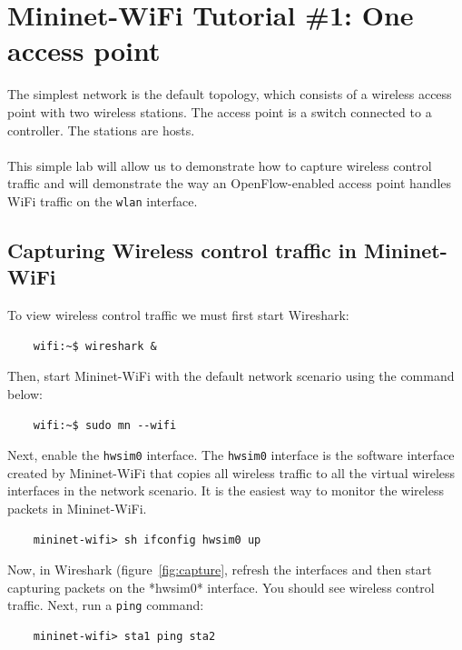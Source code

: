 \section{Mininet-WiFi Tutorial \#1: One access point}

The simplest network is the default topology, which consists of a wireless access point with two wireless stations. The access point is a switch connected to a controller. The stations are hosts.\\\\

\noindent This simple lab will allow us to demonstrate how to capture wireless control traffic and will demonstrate the way an OpenFlow-enabled access point handles WiFi traffic on the \texttt{wlan} interface.

\subsection{Capturing Wireless control traffic in Mininet-WiFi}

To view wireless control traffic we must first start Wireshark:

\begin{verbatim}
    wifi:~$ wireshark &
\end{verbatim}

\noindent Then, start Mininet-WiFi with the default network scenario using the command below:

\begin{verbatim}
    wifi:~$ sudo mn --wifi
\end{verbatim}

\noindent Next, enable the \texttt{hwsim0} interface. The \texttt{hwsim0} interface is the software interface created by Mininet-WiFi that copies all wireless traffic to all the virtual wireless interfaces in the network scenario. It is the easiest way to monitor the wireless packets in Mininet-WiFi.

\begin{verbatim}
    mininet-wifi> sh ifconfig hwsim0 up
\end{verbatim}

\noindent Now, in Wireshark (figure~\ref{fig:capture}, refresh the interfaces and then start capturing packets on the *hwsim0* interface. You should see wireless control traffic. Next, run a \texttt{ping} command:

\begin{verbatim}
    mininet-wifi> sta1 ping sta2
\end{verbatim}    

